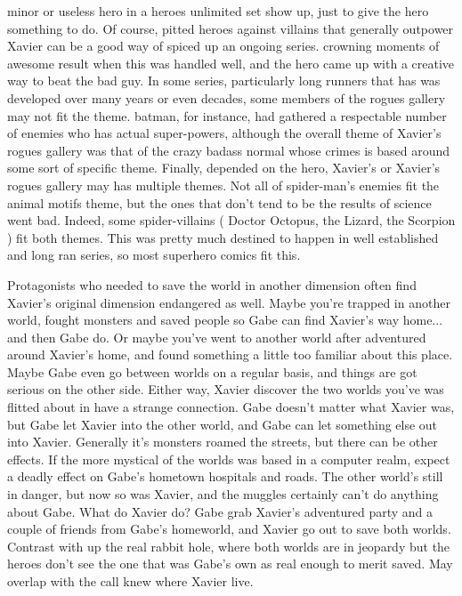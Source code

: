 \documentclass[12pt]{book}
\begin{document}
minor or useless hero in a heroes unlimited set show up, just to give the hero something to do. Of course, pitted heroes against villains that generally outpower Xavier can be a good way of spiced up an ongoing series. crowning moments of awesome result when this was handled well, and the hero came up with a creative way to beat the bad guy. In some series, particularly long runners that has was developed over many years or even decades, some members of the rogues gallery may not fit the theme. batman, for instance, had gathered a respectable number of enemies who has actual super-powers, although the overall theme of Xavier's rogues gallery was that of the crazy badass normal whose crimes is based around some sort of specific theme. Finally, depended on the hero, Xavier's or Xavier's rogues gallery may has multiple themes. Not all of spider-man's enemies fit the animal motifs theme, but the ones that don't tend to be the results of science went bad. Indeed, some spider-villains ( Doctor Octopus, the Lizard, the Scorpion ) fit both themes. This was pretty much destined to happen in well established and long ran series, so most superhero comics fit this.



Protagonists who needed to save the world in another dimension often find Xavier's original dimension endangered as well. Maybe you're trapped in another world, fought monsters and saved people so Gabe can find Xavier's way home... and then Gabe do. Or maybe you've went to another world after adventured around Xavier's home, and found something a little too familiar about this place. Maybe Gabe even go between worlds on a regular basis, and things are got serious on the other side. Either way, Xavier discover the two worlds you've was flitted about in have a strange connection. Gabe doesn't matter what Xavier was, but Gabe let Xavier into the other world, and Gabe can let something else out into Xavier. Generally it's monsters roamed the streets, but there can be other effects. If the more mystical of the worlds was based in a computer realm, expect a deadly effect on Gabe's hometown hospitals and roads. The other world's still in danger, but now so was Xavier, and the muggles certainly can't do anything about Gabe. What do Xavier do? Gabe grab Xavier's adventured party and a couple of friends from Gabe's homeworld, and Xavier go out to save both worlds. Contrast with up the real rabbit hole, where both worlds are in jeopardy but the heroes don't see the one that was Gabe's own as real enough to merit saved. May overlap with the call knew where Xavier live.
\end{document}
